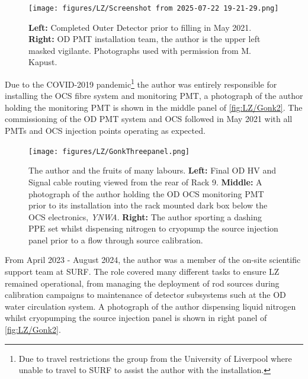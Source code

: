 \begin{figure}[ht!]
    \centering
    \texttt{[image: figures/LZ/Screenshot from 2025-07-22 19-21-29.png]}
    \caption[Completed Outer Detector prior to filling in May 2021 alongside OD PMT installation team.]{\textbf{Left:} Completed Outer Detector prior to filling in May 2021. \textbf{Right:} OD PMT installation team, the author is the upper left masked vigilante. Photographs used with permission from M. Kapust.}
    \label{fig:LZ/ODImg}
\end{figure}

Due to the COVID-2019 pandemic\footnote{Due to travel restrictions the group from the University of Liverpool where unable to travel to SURF to assist the author with the installation.} the author was entirely responsible for installing the OCS fibre system and monitoring PMT, a photograph of the author holding the monitoring PMT is shown in the middle panel of \autoref{fig:LZ/Gonk2}. The commissioning of the OD PMT system and OCS followed in May 2021 with all PMTs and OCS injection points operating as expected.

\begin{figure}[ht!]
    \centering
    \texttt{[image: figures/LZ/GonkThreepanel.png]}
    \caption{The author and the fruits of many labours. \textbf{Left:} Final OD HV and Signal cable routing viewed from the rear of Rack 9. \textbf{Middle:} A photograph of the author holding the OD OCS monitoring PMT prior to its installation into the rack mounted dark box below the OCS electronics, \textit{YNWA}. \textbf{Right:} The author sporting a dashing PPE set whilst dispensing nitrogen to cryopump the source injection panel prior to a flow through source calibration.}
    \label{fig:LZ/Gonk2}
\end{figure}

From April 2023 - August 2024, the author was a member of the on-site scientific support team at SURF. The role covered many different tasks to ensure LZ remained operational, from managing the deployment of rod sources during calibration campaigns to maintenance of detector subsystems such at the OD water circulation system. A photograph of the author dispensing liquid nitrogen whilst cryopumping the source injection panel is shown in right panel of \autoref{fig:LZ/Gonk2}.

